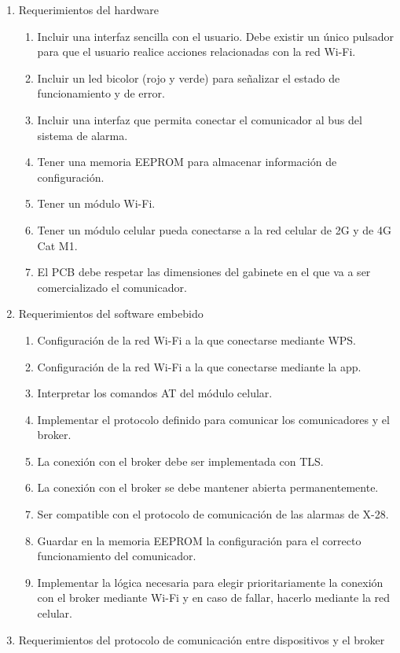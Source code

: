 \documentclass[
11pt, %
codirector, %
]{charter}
\begin{document}
\begin{enumerate}
	\item Requerimientos del hardware
		\begin{enumerate}
			\item Incluir una interfaz sencilla con el usuario. Debe existir un único pulsador para que el usuario realice acciones relacionadas con la red Wi-Fi.
			\item Incluir un led bicolor (rojo y verde) para señalizar el estado de funcionamiento y de error.
			\item Incluir una interfaz que permita conectar el comunicador al bus del sistema de alarma.
			\item Tener una memoria EEPROM para almacenar información de configuración.
			\item Tener un módulo Wi-Fi.
			\item Tener un módulo celular pueda conectarse a la red celular de 2G y de 4G Cat M1.
			\item El PCB debe respetar las dimensiones del gabinete en el que va a ser comercializado el comunicador.
		\end{enumerate}
	\item Requerimientos del software embebido
		\begin{enumerate}
			\item Configuración de la red Wi-Fi a la que conectarse mediante WPS.
			\item Configuración de la red Wi-Fi a la que conectarse mediante la app.
			\item Interpretar los comandos AT del módulo celular.
			\item Implementar el protocolo definido para comunicar los comunicadores y el broker.
			\item La conexión con el broker debe ser implementada con TLS.
			\item La conexión con el broker se debe mantener abierta permanentemente.
			\item Ser compatible con el protocolo de comunicación de las alarmas de X-28.
			\item Guardar en la memoria EEPROM la configuración para el correcto funcionamiento del comunicador.
			\item Implementar la lógica necesaria para elegir prioritariamente la conexión con el broker mediante Wi-Fi y en caso de fallar, hacerlo mediante la red celular.
		\end{enumerate}
	\item Requerimientos del protocolo de comunicación entre dispositivos y el broker

\end{enumerate}
\end{document}
